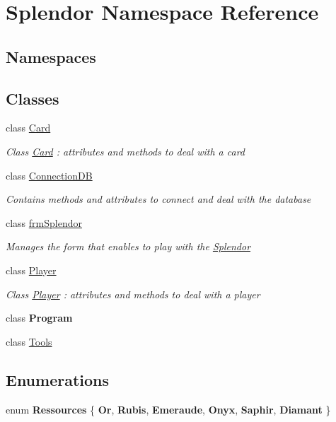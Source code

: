 \hypertarget{namespace_splendor}{}\section{Splendor Namespace Reference}
\label{namespace_splendor}
\subsection*{Namespaces}
\begin{DoxyCompactItemize}
\end{DoxyCompactItemize}
\subsection*{Classes}
\begin{DoxyCompactItemize}
\item 
class \hyperlink{class_splendor_1_1_card}{Card}
\begin{DoxyCompactList}\small\item\em Class \hyperlink{class_splendor_1_1_card}{Card} \+: attributes and methods to deal with a card \end{DoxyCompactList}\item 
class \hyperlink{class_splendor_1_1_connection_d_b}{Connection\+DB}
\begin{DoxyCompactList}\small\item\em Contains methods and attributes to connect and deal with the database \end{DoxyCompactList}\item 
class \hyperlink{class_splendor_1_1frm_splendor}{frm\+Splendor}
\begin{DoxyCompactList}\small\item\em Manages the form that enables to play with the \hyperlink{namespace_splendor}{Splendor} \end{DoxyCompactList}\item 
class \hyperlink{class_splendor_1_1_player}{Player}
\begin{DoxyCompactList}\small\item\em Class \hyperlink{class_splendor_1_1_player}{Player} \+: attributes and methods to deal with a player \end{DoxyCompactList}\item 
class {\bfseries Program}
\item 
class \hyperlink{class_splendor_1_1_tools}{Tools}
\end{DoxyCompactItemize}
\subsection*{Enumerations}
\begin{DoxyCompactItemize}
\item 
\mbox{\label{namespace_splendor_abc955fe800ad5f701f777df0a2a29dc2}} 
enum {\bfseries Ressources} \{ \newline
{\bfseries Or}, 
{\bfseries Rubis}, 
{\bfseries Emeraude}, 
{\bfseries Onyx}, 
\newline
{\bfseries Saphir}, 
{\bfseries Diamant}
 \}
\end{DoxyCompactItemize}
